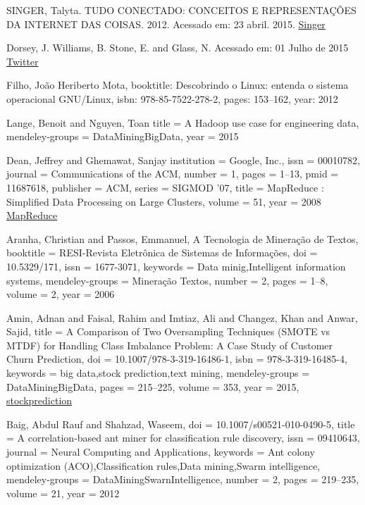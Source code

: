 \documentclass[conference,compsoc]{IEEEtran}
\begin{document}
\begin{thebibliography}{1}
  
SINGER, Talyta. TUDO CONECTADO: CONCEITOS E REPRESENTAÇÕES DA INTERNET DAS COISAS. 2012.
Acessado em: 23 abril. 2015.
\href{http://www.simsocial2012.ufba.br/modulos/submissao/Upload/44965.pdf} {Singer}

Dorsey, J. Williams, B. Stone, E. and Glass, N.
Acessado em: 01 Julho de 2015
\href {https://pt.wikipedia.org/wiki/Twitter}
{Twitter}

  Filho, João Heriberto Mota,
  booktitle: {Descobrindo o Linux: entenda o sistema operacional GNU/Linux},
  isbn: {978-85-7522-278-2},
  pages: {153--162},
  year: {2012}




Lange, Benoit and Nguyen, Toan
title = {{A Hadoop use case for engineering data}},
mendeley-groups = {DataMiningBigData},
year = {2015}


Dean, Jeffrey and Ghemawat, Sanjay
institution = {Google, Inc.},
issn = {00010782},
journal = {Communications of the ACM},
number = {1},
pages = {1--13},
pmid = {11687618},
publisher = {ACM},
series = {SIGMOD '07},
title = {{MapReduce : Simplified Data Processing on Large Clusters}},
volume = {51},
year = {2008}
\href{http://portal.acm.org/citation.cfm?id=1327492}{MapReduce}


Aranha, Christian and Passos, Emmanuel,
A Tecnologia de Mineração de Textos,
booktitle = {RESI-Revista Eletrônica de Sistemas de Informações},
doi = {10.5329/171},
issn = {1677-3071},
keywords = {Data minig,Intelligent information systems},
mendeley-groups = {Mineração Textos},
number = {2},
pages = {1--8},
volume = {2},
year = {2006}


Amin, Adnan and Faisal, Rahim and Imtiaz, Ali and Changez, Khan and Anwar, Sajid,
title = {{A Comparison of Two Oversampling Techniques (SMOTE vs MTDF) for Handling Class Imbalance Problem: A Case Study of Customer Churn Prediction}},
doi = {10.1007/978-3-319-16486-1},
isbn = {978-3-319-16485-4},
keywords = {big data,stock prediction,text mining},
mendeley-groups = {DataMiningBigData},
pages = {215--225},
volume = {353},
year = {2015},
\href{http://link.springer.com/10.1007/978-3-319-16486-1}{stockprediction}





Baig, Abdul Rauf and Shahzad, Waseem,
doi = {10.1007/s00521-010-0490-5},
title = {{A correlation-based ant miner for classification rule discovery}},
issn = {09410643},
journal = {Neural Computing and Applications},
keywords = {Ant colony optimization (ACO),Classification rules,Data mining,Swarm intelligence},
mendeley-groups = {DataMiningSwarnIntelligence},
number = {2},
pages = {219--235},
volume = {21},
year = {2012}



\end{thebibliography}
\end{document}
